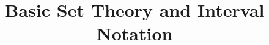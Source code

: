 \documentclass{ximera}
\title{Basic Set Theory and Interval Notation} \license{CC BY-NC-SA 4.0}
\begin{document}
\begin{abstract}
\end{abstract}
\maketitle




\label{AppSetTheory}




\end{document}
